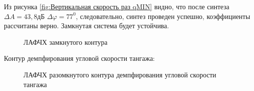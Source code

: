 Из рисунка \ref{fig:Вертикальная скорость раз qMIN} видно, что после синтеза $\Delta A = 43,8 $дБ $\Delta \varphi = 77^0$, следовательно, синтез проведен успешно, коэффициенты рассчитаны верно. Замкнутая система будет устойчива. 

\begin{figure}[H]
    \caption{ЛАФЧХ замкнутого контура }
    \label{fig:Вертикальная скорость зам qMIN}
\end{figure}

\begin{center}
    Контур демпфирования угловой скорости тангажа:
\end{center}

\begin{figure}[H]
    \caption{ЛАФЧХ разомкнутого контура демпфирования угловой скорости тангажа}
    \label{fig:Угловая скорость тангажа раз qMAX}
\end{figure}


